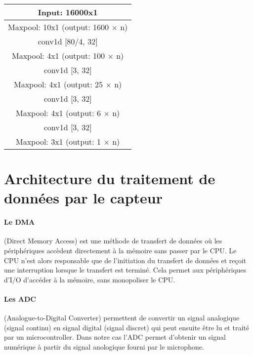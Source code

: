 \begin{center}
  \begin{tabular}{ |c|}
   \hline
    Input: 16000x1\\
   \hline
    Maxpool: 10x1 (output: 1600 × n)\\
   \hline
    conv1d [80/4, 32]\\
   \hline
    Maxpool: 4x1 (output: 100 × n)\\
   \hline
    conv1d [3, 32]\\
   \hline
    Maxpool: 4x1 (output: 25 × n)\\
   \hline
    conv1d [3, 32]\\
   \hline
    Maxpool: 4x1 (output: 6 × n)\\
   \hline
    conv1d [3, 32]\\
   \hline
    Maxpool: 3x1 (output: 1 × n)\\
   \hline
  \end{tabular}
\end{center}

\section{Architecture du traitement de données par le capteur}



\paragraph{Le DMA} (Direct Memory Access) est une méthode de transfert de données où les périphériques accèdent directement à la mémoire sans passer par le CPU.
Le CPU n'est alors responsable que de l'initiation du transfert de données et reçoit une interruption lorsque le transfert est terminé.
Cela permet aux périphériques d'I/O d'accéder à la mémoire, sans monopoliser le CPU. \cite{DMA}

\paragraph{Les ADC} (Analogue-to-Digital Converter) permettent de convertir un signal analogique (signal continu) en signal digital (signal discret)
qui peut ensuite être lu et traité par un microcontroller. \cite{ADC} Dans notre cas l'ADC permet d'obtenir un signal numérique à partir du signal anologique
fourni par le microphone.

